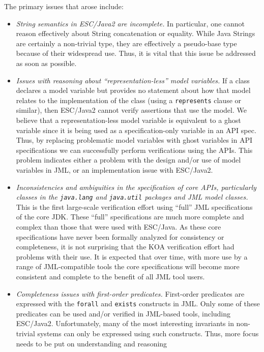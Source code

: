 \documentclass{llncs}
\begin{document}
The primary issues that arose include:
\begin{itemize}
\item \emph{String semantics in ESC/Java2 are incomplete.}  In
  particular, one cannot reason effectively about String concatenation
  or equality.  While Java Strings are certainly a non-trivial type,
  they are effectively a pseudo-base type because of their widespread
  use.  Thus, it is vital that this issue be addressed as soon as
  possible.
\item \emph{Issues with reasoning about ``representation-less'' model
    variables.}  If a class declares a model variable but provides no
  statement about how that model relates to the implementation of the
  class (using a \texttt{represents} clause or similar), then
  ESC/Java2 cannot verify assertions that use the model.  We believe
  that a representation-less model variable is equivalent to a ghost
  variable since it is being used as a specification-only variable in
  an API spec.  Thus, by replacing problematic model variables with
  ghost variables in API specifications we can successfully perform
  verifications using the APIs.  This problem indicates either a
  problem with the design and/or use of model variables in JML, or an
  implementation issue with ESC/Java2.
\item \emph{Inconsistencies and ambiguities in the specification of
    core APIs, particularly classes in the \texttt{java.lang} and
    \texttt{java.util} packages and JML model classes.}  This is the
  first large-scale verification effort using ``full'' JML
  specifications of the core JDK.  These ``full'' specifications are
  much more complete and complex than those that were used with
  ESC/Java.  As these core specifications have never been formally
  analyzed for consistency or completeness, it is not surprising that
  the KOA verification effort had problems with their use.  It is
  expected that over time, with more use by a range of JML-compatible
  tools the core specifications will become more consistent and
  complete to the benefit of all JML tool users.
\item \emph{Completeness issues with first-order predicates.}
  First-order predicates are expressed with the \texttt{forall} and
  \texttt{exists} constructs in JML.  Only some of these predicates
  can be used and/or verified in JML-based tools, including ESC/Java2.
  Unfortunately, many of the most interesting invariants in
  non-trivial systems can only be expressed using such constructs.
  Thus, more focus needs to be put on understanding and reasoning

\end{itemize}
\end{document}
